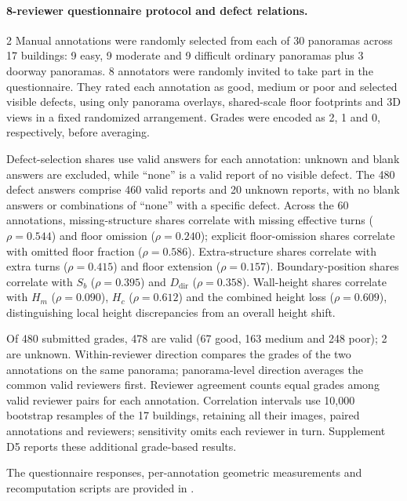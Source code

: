 

\paragraph{8-reviewer questionnaire protocol and defect relations.}
2 Manual annotations were randomly selected from each of 30 panoramas across 17 buildings: 9 easy, 9 moderate and 9 difficult ordinary panoramas plus 3 doorway panoramas. 8 annotators were randomly invited to take part in the questionnaire. They rated each annotation as good, medium or poor and selected visible defects, using only panorama overlays, shared-scale floor footprints and 3D views in a fixed randomized arrangement. Grades were encoded as 2, 1 and 0, respectively, before averaging.

Defect-selection shares use valid answers for each annotation: unknown and blank answers are excluded, while ``none'' is a valid report of no visible defect. The 480 defect answers comprise 460 valid reports and 20 unknown reports, with no blank answers or combinations of ``none'' with a specific defect. Across the 60 annotations, missing-structure shares correlate with missing effective turns (\(\rho=0.544\)) and floor omission (\(\rho=0.240\)); explicit floor-omission shares correlate with omitted floor fraction (\(\rho=0.586\)). Extra-structure shares correlate with extra turns (\(\rho=0.415\)) and floor extension (\(\rho=0.157\)). Boundary-position shares correlate with \(S_b\) (\(\rho=0.395\)) and \(D_{\mathrm{dir}}\) (\(\rho=0.358\)). Wall-height shares correlate with \(H_m\) (\(\rho=0.090\)), \(H_c\) (\(\rho=0.612\)) and the combined height loss (\(\rho=0.609\)), distinguishing local height discrepancies from an overall height shift.

Of 480 submitted grades, 478 are valid (67 good, 163 medium and 248 poor); 2 are unknown. Within-reviewer direction compares the grades of the two annotations on the same panorama; panorama-level direction averages the common valid reviewers first. Reviewer agreement counts equal grades among valid reviewer pairs for each annotation. Correlation intervals use 10,000 bootstrap resamples of the 17 buildings, retaining all their images, paired annotations and reviewers; sensitivity omits each reviewer in turn. Supplement D5 reports these additional grade-based results.

The questionnaire responses, per-annotation geometric measurements and recomputation scripts are provided in .

